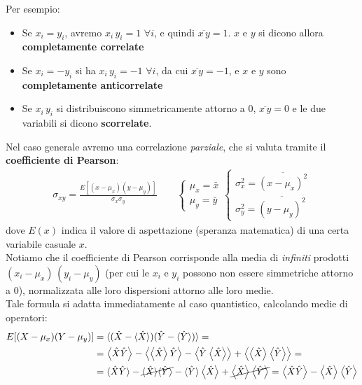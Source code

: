 \documentclass[../../InformazioneQuantistica.tex]{subfiles}
\begin{document}
Per esempio:
\begin{itemize}
\item Se $x_i=y_i$, avremo $x_i\,y_i=1$ $\forall i$, e quindi $\overline{x\,y}=1$. $x$ e $y$ si dicono allora \textbf{completamente correlate}
\item Se $x_i=-y_i$ si ha $x_i\, y_i=-1$ $\forall i$, da cui $\overline{x\,y}=-1$, e $x$ e $y$ sono \textbf{completamente anticorrelate}
\item Se $x_i\, y_i$ si distribuiscono simmetricamente attorno a $0$, $\overline{x\, y}=0$ e le due variabili si dicono \textbf{scorrelate}.
\end{itemize}
Nel caso generale avremo una correlazione \textit{parziale}, che si valuta tramite il \textbf{coefficiente di Pearson}:
\begin{align*}
\sigma_{xy} = \frac{E[(x-\mu_x)(y-\mu_y)]}{\sigma_x \sigma_y} \qquad \begin{cases}
\mu_x = \bar{x}\\
\mu_y = \bar{y}
\end{cases}
\begin{cases}
\sigma_x^2 = \overline{(x-\mu_x)^2}\\
\sigma_y^2 = \overline{(y-\mu_y)^2}
\end{cases}
\end{align*}
dove $E(x)$ indica il valore di aspettazione (speranza matematica) di una certa variabile casuale $x$.\\
Notiamo che il coefficiente di Pearson corrisponde alla media di \textit{infiniti} prodotti $(x_i-\mu_x)\,(y_i-\mu_y)$ (per cui le $x_i$ e $y_i$ possono non essere simmetriche attorno a $0$), normalizzata alle loro dispersioni attorno alle loro medie.\\

Tale formula si adatta immediatamente al caso quantistico, calcolando medie di operatori:
\begin{align*}
E[(X-\mu_x)(Y-\mu_y)] &= \langle (\hat{X}-\langle \hat{X}\rangle)(\hat{Y}-\langle \hat{Y}\rangle)\rangle = \\
&= \left\langle{\hat{X}\hat{Y}}\right\rangle - \left\langle{\left\langle{\hat{X}}\right\rangle\hat{Y}}\right\rangle - \left\langle{\hat{Y}\left\langle{ \hat{X}}\right\rangle}\right\rangle+ \left\langle{\left\langle{\hat{X}}\right\rangle\left\langle{\hat{Y}}\right\rangle}\right\rangle = \\
&= \langle \hat{X}\hat{Y}\rangle -\cancel{ \langle \hat{X}\rangle \langle \hat{Y}\rangle} - \langle \hat{Y}\rangle \left\langle{\hat{X}}\right\rangle +\cancel{ \left\langle{\hat{X}}\right\rangle\left\langle{\hat{Y}}\right\rangle} =\left\langle{\hat{X}\hat{Y}}\right\rangle-\left\langle{\hat{X}}\right\rangle\left\langle{\hat{Y}}\right\rangle
\end{align*}
\end{document}
